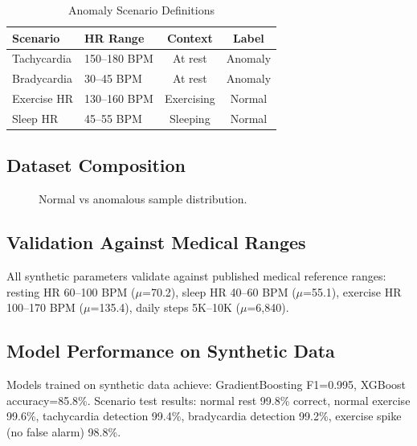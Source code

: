 \begin{table}[H]
\centering
\caption{Anomaly Scenario Definitions}
\label{tab:scenarios}
\begin{tabular}{llcc}
\toprule
\textbf{Scenario} & \textbf{HR Range} & \textbf{Context} & \textbf{Label} \\
\midrule
Tachycardia & 150--180 BPM & At rest & Anomaly \\
Bradycardia & 30--45 BPM & At rest & Anomaly \\
Exercise HR & 130--160 BPM & Exercising & Normal \\
Sleep HR & 45--55 BPM & Sleeping & Normal \\
\bottomrule
\end{tabular}
\end{table}

\subsection{Dataset Composition}

\begin{figure}[H]
\centering
{}
\caption{Normal vs anomalous sample distribution.}
\label{fig:dataset}
\end{figure}

\subsection{Validation Against Medical Ranges}
All synthetic parameters validate against published medical reference ranges: resting HR 60--100 BPM ($\mu$=70.2), sleep HR 40--60 BPM ($\mu$=55.1), exercise HR 100--170 BPM ($\mu$=135.4), daily steps 5K--10K ($\mu$=6,840).

\subsection{Model Performance on Synthetic Data}
Models trained on synthetic data achieve: GradientBoosting F1=0.995, XGBoost accuracy=85.8\%. Scenario test results: normal rest 99.8\% correct, normal exercise 99.6\%, tachycardia detection 99.4\%, bradycardia detection 99.2\%, exercise spike (no false alarm) 98.8\%.

